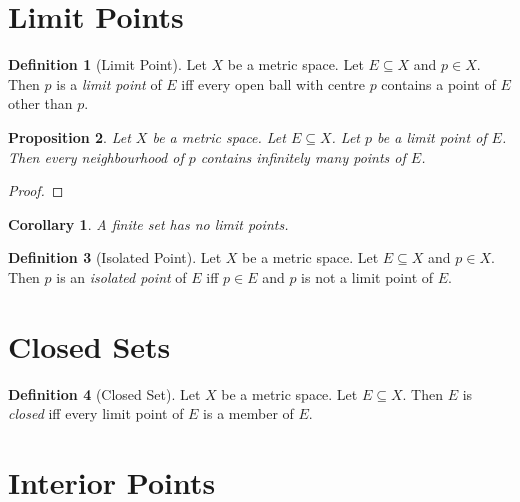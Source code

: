 \documentclass{book}
\let\qed\relax
\newtheorem{prop}{Proposition}[chapter]
\newtheorem{cor}{Corollary}[prop]
\theoremstyle{definition}
\newtheorem{df}[prop]{Definition}
\begin{document}
\section{Limit Points}

\begin{df}[Limit Point]
Let $X$ be a metric space. Let $E \subseteq X$ and $p \in X$. Then $p$ is a \emph{limit point} of $E$ iff every open ball with centre $p$ contains a point of $E$ other than $p$.
\end{df}

\begin{prop}
\label{prop:limit_point_infinite_intersection}
Let $X$ be a metric space. Let $E \subseteq X$. Let $p$ be a limit point of $E$. Then every neighbourhood of $p$ contains infinitely many points of $E$.
\end{prop}

\begin{proof}
\pf
{}
\qed
\end{proof}

\begin{cor}
\label{cor:finite_no_limit_points}
A finite set has no limit points.
\end{cor}

\begin{df}[Isolated Point]
Let $X$ be a metric space. Let $E \subseteq X$ and $p \in X$. Then $p$ is an \emph{isolated point} of $E$ iff $p \in E$ and $p$ is not a limit point of $E$.
\end{df}

\section{Closed Sets}

\begin{df}[Closed Set]
Let $X$ be a metric space. Let $E \subseteq X$. Then $E$ is \emph{closed} iff every limit point of $E$ is a member of $E$.
\end{df}

\section{Interior Points}
\end{document}

